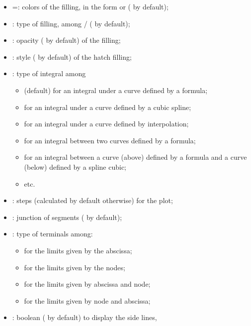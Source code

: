 \documentclass[11pt,a4paper]{ltxdoc}
\begin{document}
\begin{itemize}
	\item {} =: colors of the filling, in the form  or  ( by default);
	\item {}: type of filling, among / ( by default);
	\item {}: opacity ( by default) of the filling;
	\item {}: style ( by default) of the hatch filling;
	\item {}: type of integral among
	\begin{itemize}
		\item {} (default) for an integral under a curve defined by a formula;
		\item {} for an integral under a curve defined by a cubic spline;
		\item {} for an integral under a curve defined by interpolation;
		\item {} for an integral between two curves defined by a formula;
		\item {} for an integral between a curve (above) defined by a formula and a curve (below) defined by a spline cubic;
		\item etc.
	\end{itemize}
	\item {}: steps (calculated by default otherwise) for the plot;
	\item {}: junction of segments ( by default);
	\item {}: type of terminals among:
	\begin{itemize}
		\item {} for the limits given by the abscissa;
		\item {} for the limits given by the nodes;
		\item {} for the limits given by abscissa and node;
		\item {} for the limits given by node and abscissa;
	\end{itemize}
	\item {}: boolean ( by default) to display the side lines,%

\end{itemize}
\end{document}
